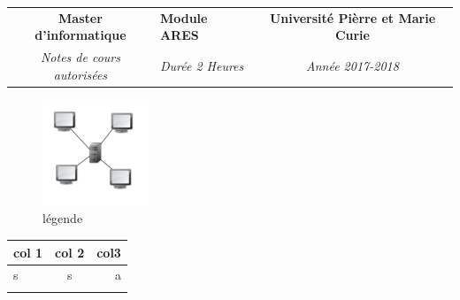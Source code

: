 \documentclass[french,a4paper,answers,addpoints,12pt]{exam}%
\newcommand{\class}{Master d'informatique}%
\newcommand{\examunit}{ARES}%
\newcommand{\allowdocuments}{Notes de cours autorisées}%
\newcommand{\examyear}{2017{-}2018}%
\newcommand{\timelimit}{2 Heures}%
\newcommand{\university}{Université Pièrre et Marie Curie}%
\begin{document}
%
\normalsize%
\pagestyle{header}%
\begin{tabularx}{\linewidth}{c X c}%
\textbf{\class}&\textbf{Module \examunit}&\textbf{\university}\\%
\textit{\allowdocuments}&\textit{Durée \timelimit}&\textit{Année \examyear}\\%
\end{tabularx}%


\begin{figure}[h!]%
\centering%
\includegraphics[width=120px]{pstl/figures/type_reseau.png}%
\caption{légende}%
\end{figure}

%
\begin{tabular}{|l|c|r|}%
 col 1 & col 2 & col3 \\%
\hline%
 s     & s     & a    \\%
&&\\%
\end{tabular}%
\linebreak%
\end{document}
